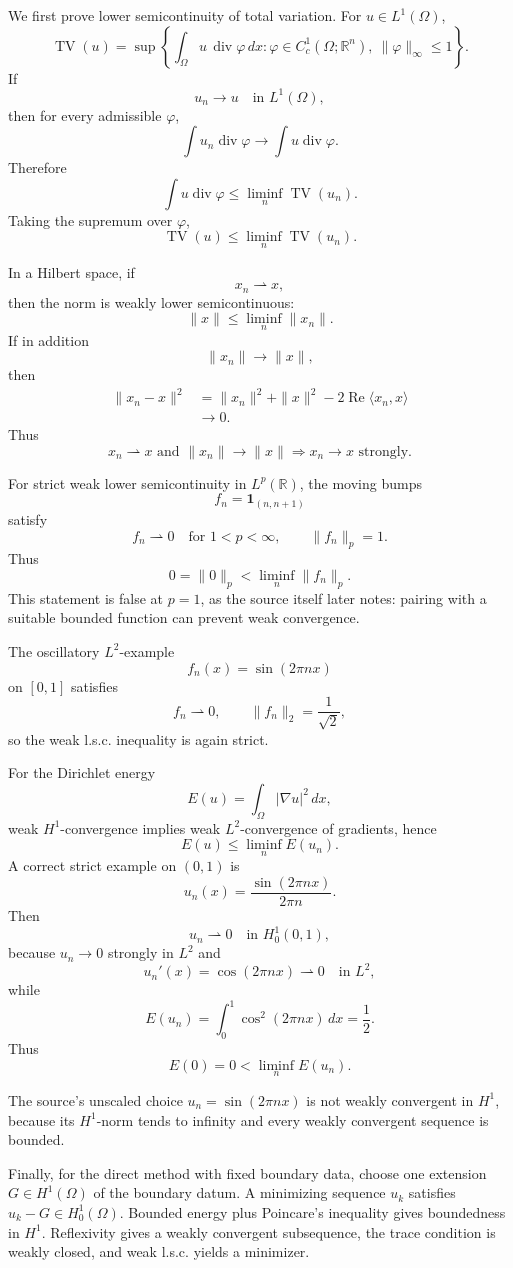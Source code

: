 \begin{solution}
We first prove lower semicontinuity of total variation. For \(u\in L^1(\Omega)\),
\[
\operatorname{TV}(u)
=
\sup\left\{
\int_\Omega u\,\operatorname{div}\varphi\,dx:
\varphi\in C_c^1(\Omega;\mathbb R^n),\
\|\varphi\|_\infty\le1
\right\}.
\]
If
\[
u_n\to u
\quad\text{in }L^1(\Omega),
\]
then for every admissible \(\varphi\),
\[
\int u_n\operatorname{div}\varphi
\longrightarrow
\int u\operatorname{div}\varphi.
\]
Therefore
\[
\int u\operatorname{div}\varphi
\le
\liminf_n\operatorname{TV}(u_n).
\]
Taking the supremum over \(\varphi\),
\[
\boxed{
\operatorname{TV}(u)
\le
\liminf_n\operatorname{TV}(u_n).
}
\]

In a Hilbert space, if
\[
x_n\rightharpoonup x,
\]
then the norm is weakly lower semicontinuous:
\[
\|x\|
\le
\liminf_n\|x_n\|.
\]
If in addition
\[
\|x_n\|\to\|x\|,
\]
then
\[
\begin{aligned}
\|x_n-x\|^2
&=
\|x_n\|^2+\|x\|^2
-2\operatorname{Re}\langle x_n,x\rangle\\
&\longrightarrow0.
\end{aligned}
\]
Thus
\[
\boxed{
x_n\rightharpoonup x
\text{ and }
\|x_n\|\to\|x\|
\Longrightarrow
x_n\to x
\text{ strongly}.
}
\]

For strict weak lower semicontinuity in \(L^p(\mathbb R)\), the moving bumps
\[
f_n=\mathbf1_{(n,n+1)}
\]
satisfy
\[
f_n\rightharpoonup0
\quad\text{for }1<p<\infty,
\qquad
\|f_n\|_p=1.
\]
Thus
\[
0=\|0\|_p
<
\liminf_n\|f_n\|_p.
\]
This statement is false at \(p=1\), as the source itself later notes: pairing with a suitable
bounded function can prevent weak convergence.

The oscillatory \(L^2\)-example
\[
f_n(x)=\sin(2\pi nx)
\]
on \([0,1]\) satisfies
\[
f_n\rightharpoonup0,
\qquad
\|f_n\|_2=\frac1{\sqrt2},
\]
so the weak l.s.c. inequality is again strict.

For the Dirichlet energy
\[
E(u)=\int_\Omega|\nabla u|^2\,dx,
\]
weak \(H^1\)-convergence implies weak \(L^2\)-convergence of gradients, hence
\[
\boxed{
E(u)\le\liminf_nE(u_n).
}
\]
A correct strict example on \((0,1)\) is
\[
u_n(x)
=
\frac{\sin(2\pi nx)}{2\pi n}.
\]
Then
\[
u_n\rightharpoonup0
\quad\text{in }H_0^1(0,1),
\]
because \(u_n\to0\) strongly in \(L^2\) and
\[
u_n'(x)=\cos(2\pi nx)\rightharpoonup0
\quad\text{in }L^2,
\]
while
\[
E(u_n)
=
\int_0^1\cos^2(2\pi nx)\,dx
=
\frac12.
\]
Thus
\[
E(0)=0<\liminf_nE(u_n).
\]

The source's unscaled choice \(u_n=\sin(2\pi nx)\) is not weakly convergent in \(H^1\),
because its \(H^1\)-norm tends to infinity and every weakly convergent sequence is bounded.

Finally, for the direct method with fixed boundary data, choose one extension
\(G\in H^1(\Omega)\) of the boundary datum. A minimizing sequence \(u_k\) satisfies
\(u_k-G\in H_0^1(\Omega)\). Bounded energy plus Poincare's inequality gives boundedness in
\(H^1\). Reflexivity gives a weakly convergent subsequence, the trace condition is weakly
closed, and weak l.s.c. yields a minimizer.
\end{solution}


